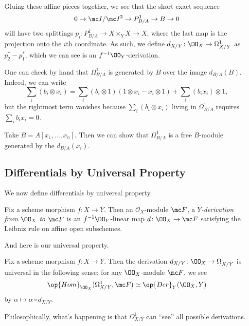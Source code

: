 \documentclass[../notes.tex]{subfiles}
\begin{document}
Gluing these affine pieces together, we see that the short exact sequence
\[0\to\mc I/\mc I^2\to P^1_{B/A}\to B\to0\]
will have two splittings $p_i\colon P^1_{B/A}\to X\times_YX\to X$, where the last map is the projection onto the $i$th coordinate. As such, we define $d_{X/Y}\colon\OO_X\to\Omega^1_{X/Y}$ as $p_2^*-p_1^*$, which we can see is an $f^{-1}\OO_Y$-derivation.
\begin{remark}
	One can check by hand that $\Omega^1_{B/A}$ is generated by $B$ over the image $d_{B/A}(B)$. Indeed, we can write
	\[\sum_i(b_i\otimes x_i)=\sum_i(b_i\otimes1)(1\otimes x_i-x_i\otimes1)+\sum_i(b_ix_i)\otimes1,\]
	but the rightmost term vanishes because $\sum_i(b_i\otimes x_i)$ living in $\Omega^1_{B/A}$ requires $\sum_ib_ix_i=0$.
\end{remark}
\begin{example}
	Take $B=A[x_1,\ldots,x_n]$. Then we can show that $\Omega^1_{B/A}$ is a free $B$-module generated by the $d_{B/A}(x_i)$.
\end{example}

\subsection{Differentials by Universal Property}
We now define differentials by universal property.
\begin{definition}[Derivation]
	Fix a scheme morphism $f\colon X\to Y$. Then an $\mathcal O_X$-module $\mc F$, a \textit{$Y$-derivation from $\OO_X$ to $\mc F$} is an $f^{-1}\OO_Y$-linear map $d\colon\OO_X\to\mc F$ satisfying the Leibniz rule on affine open subschemes.
\end{definition}
And here is our universal property.
\begin{proposition}
	Fix a scheme morphism $f\colon X\to Y$. Then the derivation $d_{X/Y}\colon\OO_X\to\Omega^1_{X/Y}$ is universal in the following sense: for any $\OO_X$-module $\mc F$, we see
	\[\op{Hom}_{\OO_X}(\Omega^1_{X/Y},\mc F)\simeq\op{Der}_Y(\OO_X,Y)\]
	by $\alpha\mapsto\alpha\circ d_{X/Y}$.
\end{proposition}
Philosophically, what's happening is that $\Omega^1_{X/Y}$ can ``see'' all possible derivations.
\end{document}
